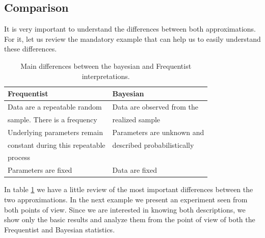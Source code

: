 \documentclass[onecolumn,           %
               showpacs,            %
               preprintnumbers,     %
               aps,                 %
               letterpaper,             %
               superscriptaddress,      %
               nofootinbib,         %
               tightenlines,        %
               floats,floatfix      %
               ,usenatbib,
               ]{revtex4-1}
\begin{document}
\subsection{Comparison}

It is very important to understand the differences between both approximations. For it, let us review the mandatory example that can help us to easily understand these differences.
\begin{table}[h!]
\centering
\begin{tabular}{||l|l||} 
 \hline
 \textbf{Frequentist} & \textbf{Bayesian} \\ [0.5ex] 
 \hline\hline
 Data are a repeatable random  & Data are observed from the   \\ 
 sample. There is a frequency & realized sample \\
 \hline 
 Underlying parameters remain & Parameters are unknown and \\
 constant during this repeatable & described probabilistically \\
 process &  \\
\hline
Parameters are fixed & Data are fixed\\ [1ex] 
 \hline
\end{tabular}
\caption{\footnotesize{Main differences between the bayesian and Frequentist interpretations.}}
\label{table:1}
\end{table}

In table \ref{table:1} we have a little review of the most important differences between the two approximations. In the next example we present an experiment seen from both points of view. Since we are interested in knowing both descriptions, we show only the basic results and analyze them from the point of view of both the Frequentist and Bayesian statistics. 
\end{document}
